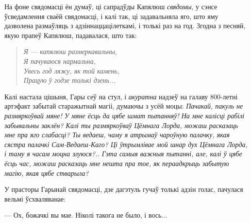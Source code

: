 На фоне свядомасці ён думаў, ці сапрадўды Капялюш \emph{свядомы},
у сэнсе ўсведамлення сваёй свядомасці, і калі так, ці задавальняла яго,
што яму дазволена размаўляць з адзіннаццацілеткамі, і толькі раз на год. 
Згодна з песняй, якую прапеў Капялюш, падавалася, што так:

\begin{verse}%
    \itshape
    Я --- капялюш размеркавальны,\\
    Я пачуваюся нармальна,\\
    Увесь год ляжу, як той камень,\\
    Працую ў годзе толькі дзень...
\end{verse}

Калі настала цішыня, Гары сеў на стул, і \emph{акуратна} надзеў на галаву 
800-летні артэфакт забытай старажытнай магіі, думаючы з усёй моцы: 
\emph{Пачакай, пакуль не размяркоўвай мяне! У мяне ёсць да цябе шмат  
пытанняў! На мне калісці рабілі забывальны заклён? Калі ты размяркоўваў Цёмнага Лорда,
можаш расказаць мне пра яго слабасці? Ты ведаеш, чаму я атрымаў чароўную палачку,
якая сястра палачкі Сам-Ведаеш-Каго? Ці ўтрымлівае мой шнар дух Цёмнага Лорда,
і таму я часам моцна злуюся?.. Гэта самыя важныя пытанні, але, калі ў цябе ёсць час,
можаш расказаць мне нешта пра тое, як пераадкрыць забытую магію, якая цябе стварыла?}

У прасторы Гарынай свядомасці, дзе дагэтуль гучаў толькі адзін голас, 
пачулася вельмі ўсхваляванае:

--- Ох, божачкі вы мае. Ніколі такога не было, і вось...
